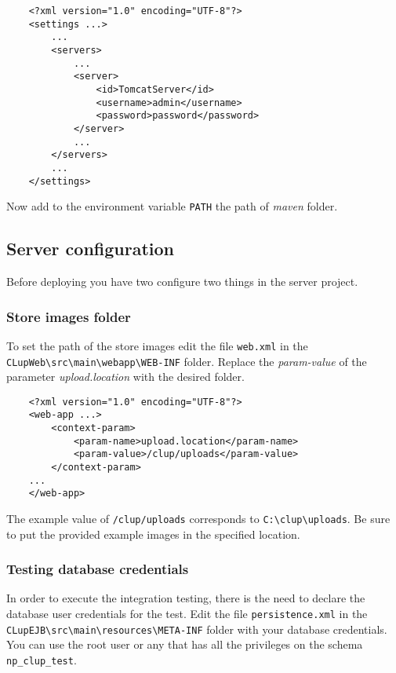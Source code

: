 
\begin{lstlisting}
	<?xml version="1.0" encoding="UTF-8"?>
	<settings ...>
		...
		<servers>
			...
			<server>
				<id>TomcatServer</id>
				<username>admin</username>
				<password>password</password>
			</server>
			...
		</servers>
		...
	</settings>
\end{lstlisting}

Now add to the environment variable \verb|PATH| the path of \textit{maven} folder.

\clearpage

\subsection{Server configuration}
Before deploying you have two configure two things in the server project.

\subsubsection{Store images folder}
To set the path of the store images edit the file \verb|web.xml| in the \verb|CLupWeb\src\main\webapp\WEB-INF| folder.
Replace the \textit{param-value} of the parameter \textit{upload.location} with the desired folder.
\begin{lstlisting}
	<?xml version="1.0" encoding="UTF-8"?>
	<web-app ...>
		<context-param>
			<param-name>upload.location</param-name>
			<param-value>/clup/uploads</param-value>
		</context-param>
	...
	</web-app>
\end{lstlisting}

The example value of \verb|/clup/uploads| corresponds to \verb|C:\clup\uploads|. Be sure to put the provided example images in the specified location.

\subsubsection{Testing database credentials} 
In order to execute the integration testing, there is the need to declare the database user credentials for the test.\newline 
Edit the file \verb|persistence.xml| in the \verb|CLupEJB\src\main\resources\META-INF| folder with your database credentials.\newline
You can use the root user or any that has all the privileges on the schema \verb|np_clup_test|.

